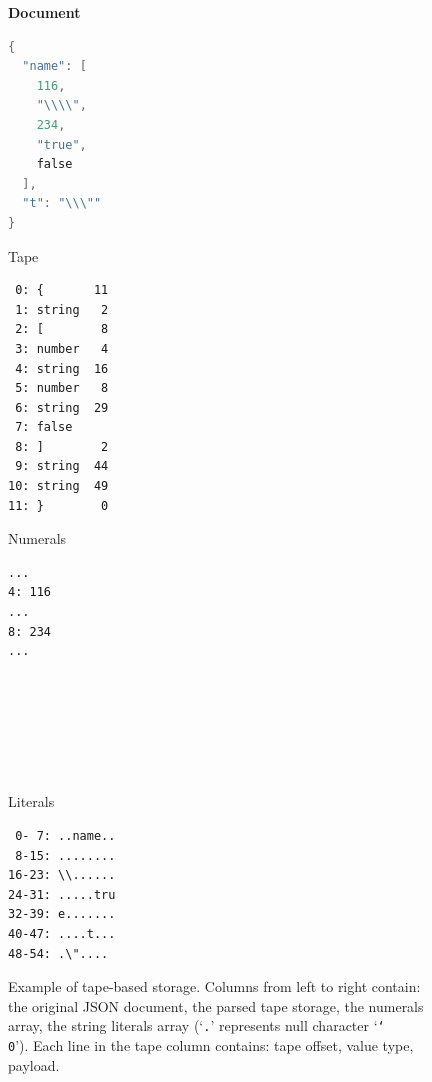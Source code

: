 \documentclass[11pt]{article}
\begin{document}
\begin{figure}
\begin{multicols}{4}
\centering\bf
Document
\begin{lstlisting}[language=C, aboveskip=2.61pt]
{
  "name": [
    116,
    "\\\\",
    234,
    "true",
    false
  ],
  "t": "\\\""
}


\end{lstlisting}
\columnbreak
Tape
\begin{verbatim}
 0: {       11
 1: string   2
 2: [        8
 3: number   4
 4: string  16
 5: number   8
 6: string  29
 7: false     
 8: ]        2
 9: string  44
10: string  49
11: }        0
\end{verbatim}
\columnbreak
Numerals
\begin{verbatim}
...
4: 116
...
8: 234
...







\end{verbatim}
\columnbreak
Literals
\begin{verbatim}
 0- 7: ..name..
 8-15: ........
16-23: \\......
24-31: .....tru
32-39: e.......
40-47: ....t...
48-54: .\"....
\end{verbatim}
\end{multicols}
\caption{Example of tape-based storage. Columns from left to right contain: the original JSON document, the parsed tape storage, the numerals array, the string literals array (`\texttt{.}' represents null character `\texttt{\char`\\0}'). Each line in the tape column contains: tape offset, value type, payload.}
\label{fig:tape}
\end{figure}
\end{document}
